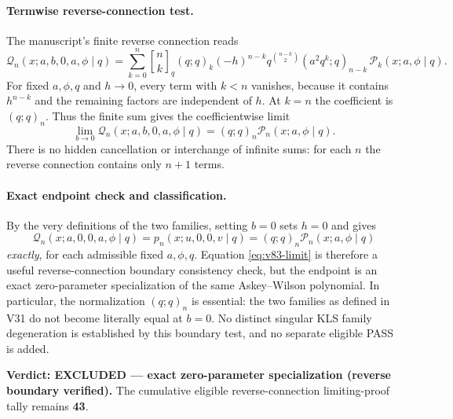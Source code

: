 \documentclass[11pt]{article}
\begin{document}
\paragraph{Termwise reverse-connection test.}
The manuscript's finite reverse connection reads
\begin{equation}\label{eq:v83-reverse}
 \mathscr Q_n(x;a,b,0,a,\phi\mid q)
 =\sum_{k=0}^n {n\brack k}_q (q;q)_k
 (-h)^{n-k}q^{\binom{n-k}{2}}
 (a^2q^k;q)_{n-k}\,
 \mathscr P_k(x;a,\phi\mid q).
\end{equation}
For fixed $a,\phi,q$ and $h\to0$, every term with $k<n$
vanishes, because it contains $h^{n-k}$ and the remaining factors
are independent of $h$.  At $k=n$ the coefficient is $(q;q)_n$.
Thus the finite sum gives the coefficientwise limit
\begin{equation}\label{eq:v83-limit}
 \lim_{b\to0}\mathscr Q_n(x;a,b,0,a,\phi\mid q)
 =(q;q)_n\mathscr P_n(x;a,\phi\mid q).
\end{equation}
There is no hidden cancellation or interchange of infinite sums:
for each $n$ the reverse connection contains only $n+1$ terms.

\paragraph{Exact endpoint check and classification.}
By the very definitions of the two families, setting $b=0$
sets $h=0$ and gives
\begin{equation}\label{eq:v83-exact}
 \mathscr Q_n(x;a,0,0,a,\phi\mid q)
 =p_n(x;u,0,0,v\mid q)
 =(q;q)_n\mathscr P_n(x;a,\phi\mid q)
\end{equation}
\emph{exactly}, for each admissible fixed $a,\phi,q$.
Equation \eqref{eq:v83-limit} is therefore a useful reverse-connection
boundary consistency check, but the endpoint is an exact
zero-parameter specialization of the same Askey--Wilson polynomial.
In particular, the normalization $(q;q)_n$ is essential: the two
families as defined in V31 do not become literally equal at $b=0$.
No distinct singular KLS family degeneration is established by this
boundary test, and no separate eligible PASS is added.

\noindent\textbf{Verdict: EXCLUDED --- exact zero-parameter
specialization (reverse boundary verified).} The cumulative eligible
reverse-connection limiting-proof tally remains \textbf{43}.
\end{document}
